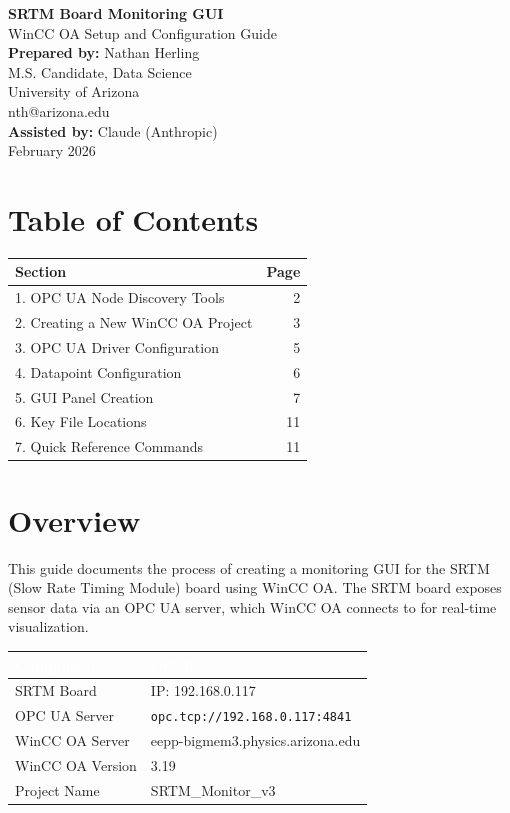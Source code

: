 \documentclass[11pt,a4paper]{article}
\begin{document}
\begin{center}
{\LARGE\bfseries SRTM Board Monitoring GUI}\\[0.5cm]
{\Large WinCC OA Setup and Configuration Guide}\\[1cm]

\textbf{Prepared by:} Nathan Herling\\
M.S. Candidate, Data Science\\
University of Arizona\\
nth@arizona.edu\\[0.5cm]

\textbf{Assisted by:} Claude (Anthropic)\\[0.5cm]

February 2026
\end{center}

\vspace{1cm}

\section*{Table of Contents}
\begin{tabular}{l r}
\toprule
\textbf{Section} & \textbf{Page} \\
\midrule
1. OPC UA Node Discovery Tools & 2 \\
2. Creating a New WinCC OA Project & 3 \\
3. OPC UA Driver Configuration & 5 \\
4. Datapoint Configuration & 6 \\
5. GUI Panel Creation & 7 \\
6. Key File Locations & 11 \\
7. Quick Reference Commands & 11 \\
\bottomrule
\end{tabular}

\newpage

\section*{Overview}
This guide documents the process of creating a monitoring GUI for the SRTM (Slow Rate Timing Module) board using WinCC OA. The SRTM board exposes sensor data via an OPC UA server, which WinCC OA connects to for real-time visualization.

\begin{center}
\begin{tabular}{|l|l|}
\hline
\rowcolor{sectionblue}\textcolor{white}{\textbf{Component}} & \textcolor{white}{\textbf{Details}} \\
\hline
SRTM Board & IP: 192.168.0.117 \\
\hline
OPC UA Server & \texttt{opc.tcp://192.168.0.117:4841} \\
\hline
WinCC OA Server & eepp-bigmem3.physics.arizona.edu \\
\hline
WinCC OA Version & 3.19 \\
\hline
Project Name & SRTM\_Monitor\_v3 \\
\hline
\end{tabular}
\end{center}
\end{document}
